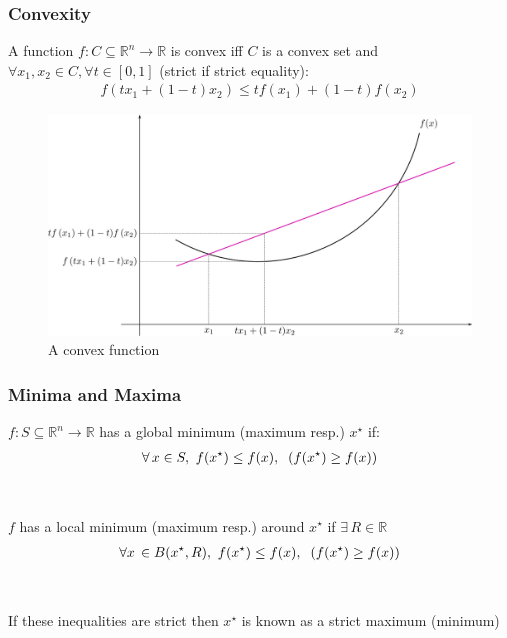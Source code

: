 \documentclass{beamer}
\def\rnum{\mathbb{R}}
\begin{document}
\begin{frame}
    \frametitle{Convexity}
    A function $f : C \subseteq \rnum^{n} \rightarrow \rnum$ is convex iff $C$
    is a convex set and $\forall x_{1}, x_{2} \in C, \forall t \in [0,1]$
    (strict if strict equality):
    \begin{align*}
        f(t x_{1} + (1-t)x_{2}) \leq t f(x_{1}) + (1-t)f(x_{2})
    \end{align*}
    \begin{figure}[t]
        \centering
        \includegraphics[scale=0.225]{function}
        \caption{A convex function}
        \label{fig:function}
    \end{figure}
\end{frame}

\begin{frame}
    \frametitle{Minima and Maxima}
    $f: S \subseteq \rnum^{n} \rightarrow \rnum$ has a global minimum (maximum
    resp.) $x^{\star}$ if:
    \begin{align*}
        \forall \, x \in S, \, \, f(x^{\star}) \leq f(x), \hspace{2mm}  (f(x^{\star}) \geq f(x))
    \end{align*}
    \\~\\
    $f$ has a local minimum (maximum resp.) around $x^{\star}$ if $\exists \, R \in
     \rnum$ 
    \begin{align*}
        \forall x \, \in B(x^{\star}, R), \, \, f(x^{\star}) \leq f(x),
        \hspace{2mm} (f(x^{\star}) \geq f(x))
    \end{align*}
    \\~\\
    If these inequalities are strict then $x^{\star}$ is known as a strict
    maximum (minimum)
\end{frame}
\end{document}
